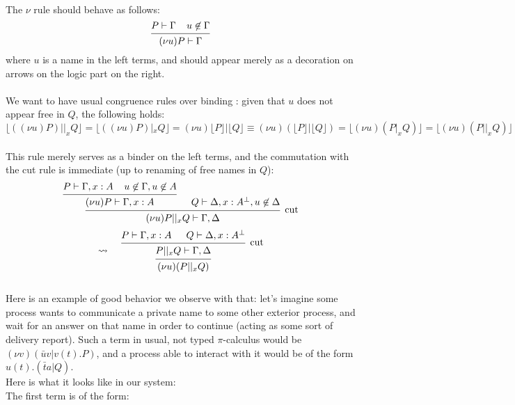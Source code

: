 \documentclass[a4paper,12pt]{article}
\begin{document}
~\\
The $\nu$ rule should behave as follows:\[
\begin{prooftree}
	\hypo{P \vdash \Gamma\;\;\;\; u \not\in \Gamma}
\infer1{(\nu u)P \vdash \Gamma}
\end{prooftree}\]
where $u$ is a name in the left terms, and should appear merely as a decoration on arrows on the logic part on the right.\\~\\
We want to have usual congruence rules over binding : given that $u$ does not appear free in $Q$, the following holds:
\[\lfloor ((\nu u)P) ||_x Q \rfloor = \lfloor ((\nu u)P) |_x Q \rfloor = (\nu u)\lfloor P \rfloor | \lfloor Q \rfloor \equiv (\nu u)(\lfloor P \rfloor|\lfloor Q \rfloor) = \lfloor (\nu u) (P |_x Q) \rfloor = \lfloor (\nu u) (P ||_x Q) \rfloor\]
~\\
This rule merely serves as a binder on the left terms, and the commutation with the cut rule is immediate (up to renaming of free names in $Q$):
\[\begin{prooftree}
		\hypo{P \vdash \Gamma, x:A\;\;\;\; u\not\in\Gamma,u\not\in A}
	\infer1{(\nu u)P \vdash \Gamma, x:A}
	\hypo{Q \vdash \Delta, x:A^\bot, u\not\in\Delta}
\infer2[cut]{(\nu u)P ||_x Q \vdash \Gamma,\Delta}
\end{prooftree}\]
\[\leadsto\;\;\;\;\begin{prooftree}
		\hypo{P \vdash \Gamma,x:A}
		\hypo{Q \vdash \Delta,x:A^\bot}
	\infer2[cut]{P||_xQ \vdash \Gamma,\Delta}
\infer1{(\nu u)(P ||_x Q)}
\end{prooftree}\]
~\\
Here is an example of good behavior we observe with that: let's imagine some process wants to communicate a private name to some other exterior process, and wait for an answer on that name in order to continue (acting as some sort of delivery report). Such a term in usual, not typed $\pi$-calculus would be $(\nu v)(\bar{u}v | v(t).P)$, and a process able to interact with it would be of the form $u(t).(\bar{t}a|Q)$.\\
Here is what it looks like in our system:\\
The first term is of the form:
\end{document}
